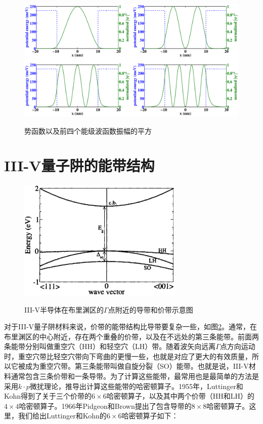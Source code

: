 \documentclass[oneside]{ZJUthesis}
\begin{document}
\begin{figure}[!h]
  \centering
  \includegraphics[width=1.0\textwidth]{./Pictures/waves.eps}\\
  \caption{势函数以及前四个能级波函数振幅的平方}
  \label{fig_waves}
\end{figure}

\section{III-V量子阱的能带结构}

\begin{figure}[!h]
  \centering
  \includegraphics[width=0.7\textwidth]{./Pictures/bands.eps}\\
  \caption{III-V半导体在布里渊区的$\Gamma$点附近的导带和价带示意图}
  \label{fig_bands}
\end{figure}

对于III-V量子阱材料来说，价带的能带结构比导带要复杂一些，如图\ref{fig_bands}。通常，在布里渊区的中心附近，存在两个重叠的价带，以及在不远处的第三条能带。前面两条能带分别叫做重空穴（HH）和轻空穴（LH）带。随着波矢向远离$\Gamma$点方向运动时，重空穴带比轻空穴带向下弯曲的更慢一些，也就是对应了更大的有效质量，所以它被成为重空穴带。第三条能带叫做自旋分裂（SO）能带。也就是说，III-V材料通常包含三条价带和一条导带。为了计算这些能带，最常用也是最简单的方法是采用$k\cdot p$微扰理论，推导出计算这些能带的哈密顿算子。1955年，Luttinger和Kohn得到了关于三个价带的$6\times6$哈密顿算子，以及其中两个价带（HH和LH）的$4\times4$哈密顿算子\cite{Luttinger1955Motion}。1966年Pidgeon和Brown提出了包含导带的$8\times8$哈密顿算子\cite{Pidgeon1966Interband}。这里，我们给出Luttinger和Kohn的$6\times6$哈密顿算子如下：
\end{document}
